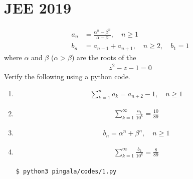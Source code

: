 \documentclass[journal,12pt,twocolumn]{IEEEtran}
\renewcommand\thesection{\arabic{section}}
\begin{document}
\section{JEE 2019}
\begin{align}
	\label{eq:pingala/10-orig-diff-a}
	a_n &= \frac{\alpha^{n}-\beta^{n}}{\alpha - \beta}, \quad n \ge 1
	\\
	b_n &= a_{n-1} + a_{n+1}, \quad n \ge 2, \quad b_1 =1
	\label{eq:pingala/10-orig-diff}
\end{align}
where $\alpha$ and $\beta$ ($\alpha > \beta$) are the roots of the
\begin{align}
z^2 - z - 1 = 0
\end{align}
%
Verify the following using a python code.
\begin{enumerate}[label=\thesection.\arabic*,ref=\thesection.\theenumi]
\item 
	\label{itm:ping-1}
\begin{align}
	\label{eq:ping-1}
	\sum_{k=1}^{n}a_k = a_{n+2}-1, \quad n \ge 1
\end{align}
 \item 
	\label{itm:ping-2}
\begin{align}
	\label{eq:ping-2}
	\sum_{k=1}^{\infty}\frac{a_k}{10^k} =\frac{10}{89}
\end{align}
 \item 
	\label{itm:ping-3}
\begin{align}
	\label{eq:ping-3}
	b_n =\alpha^n + \beta^n, \quad n \ge 1
\end{align}
 \item 
	\label{itm:ping-4}
\begin{align}
	\label{eq:ping-4}
	\sum_{k=1}^{\infty}\frac{b_k}{10^k} =\frac{8}{89}
\end{align}
\solution
\begin{lstlisting}
$ python3 pingala/codes/1.py
\end{lstlisting}
\end{enumerate}
\end{document}
